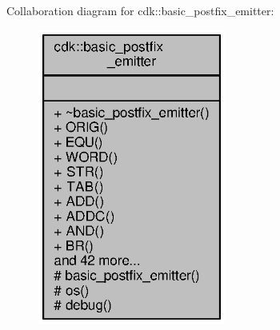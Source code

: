Collaboration diagram for cdk\+:\+:basic\+\_\+postfix\+\_\+emitter\+:
\nopagebreak
\begin{figure}[H]
\begin{center}
\leavevmode
\includegraphics[width=175pt]{classcdk_1_1basic__postfix__emitter__coll__graph}
\end{center}
\end{figure}
